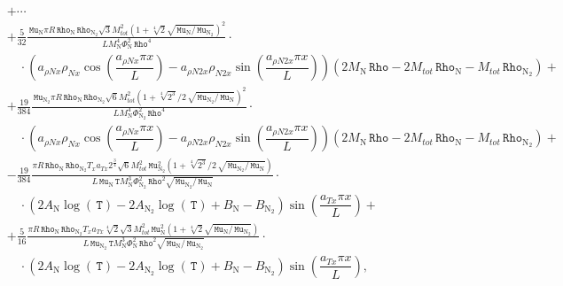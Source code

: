 \documentclass[10pt]{article}
\newcommand{\diff}[2] {\dfrac{\partial #1 }{\partial #2}}
\newcommand{\Rho}{\,\mathtt{Rho}}
\newcommand{\T}{\,\mathtt{T}}
\newcommand{\N}{\text{N}}
\newcommand{\Mu}{\, \mathtt{Mu}}
\newcommand{\mix}{\text{mix}\,}
\newcommand{\DKappatrDx}{\diff{\kappa^{tr}_{\mix}}{x}\,}
\begin{document}
\begin{equation*}
\begin{split} %
&+\cdots\\%
&+ \frac{5}{32} \frac{\Mu_{\N} \pi R \Rho_{\N} \Rho_{\N_2} \sqrt{3} M_{tot}^{2} \left(1 + \sqrt[4]{2} \sqrt{ \Mu_{\N} / \Mu_{\N_2}
}\right)^{2} }{L M_{\N}^{4} \Phi_{\N}^{2} \Rho^{4}} \cdot\\
 &\quad \cdot \left(a_{\rho N x} \rho_{N x} \cos\left(\dfrac{a_{\rho N x} \pi x}{L}\right) - a_{\rho N2 x} \rho_{N2 x}
\sin\left(\dfrac{a_{\rho N2 x} \pi x}{L}\right)\right)\left(2 M_{\N} \Rho - 2 M_{tot} \Rho_{\N} - M_{tot} \Rho_{\N_2}\right) +\\ 
%
&+ \frac{19}{384} \frac{\Mu_{\N_2} \pi R \Rho_{\N} \Rho_{\N_2} \sqrt{6} M_{tot}^{2} \left(1 + \sqrt[4]{2^3} / 2 \, \sqrt{
\Mu_{\N_2} / \Mu_{\N} }\right)^{2} }{L M_{\N}^{4} \Phi_{\N_2}^{2} \Rho^{4}} \cdot\\
 &\quad \cdot \left(a_{\rho N x} \rho_{N x} \cos\left(\dfrac{a_{\rho N x} \pi x}{L}\right) - a_{\rho N2 x} \rho_{N2 x}
\sin\left(\dfrac{a_{\rho N2 x} \pi x}{L}\right)\right)\left(2 M_{\N} \Rho - 2 M_{tot} \Rho_{\N} - M_{tot} \Rho_{\N_2}\right) +\\ 
%
&- \frac{19}{384} \frac{\pi R \Rho_{\N} \Rho_{\N_2} T_{x} a_{Tx} 2^{\frac{3}{4}} \sqrt{6} M_{tot}^{2} \Mu_{\N_2}^{2} \left(1 +
\sqrt[4]{2^3} / 2 \, \sqrt{ \Mu_{\N_2} / \Mu_{\N} }\right) }{L \Mu_{\N} \T M_{\N}^{3} \Phi_{\N_2}^{2} \Rho^{2} \sqrt{\Mu_{\N_2} /
\Mu_{\N} } } \cdot\\
 &\quad \cdot ( 2 A_{\N} \log(\T) - 2 A_{\N_2} \log(\T) +B_{\N} - B_{\N_2} ) \sin\left(\dfrac{a_{Tx} \pi x}{L}\right) +\\ 
%
&+ \frac{5}{16} \frac{\pi R \Rho_{\N} \Rho_{\N_2} T_{x} a_{Tx} \sqrt[4]{2} \sqrt{3} M_{tot}^{2} \Mu_{\N}^{2} \left(1 + \sqrt[4]{2}
\sqrt{ \Mu_{\N} / \Mu_{\N_2} }\right) }{L \Mu_{\N_2} \T M_{\N}^{3} \Phi_{\N}^{2} \Rho^{2} \sqrt{\Mu_{\N} / \Mu_{\N_2} } } \cdot\\
 &\quad \cdot ( 2 A_{\N} \log(\T) - 2 A_{\N_2} \log(\T) +B_{\N} - B_{\N_2} ) \sin\left(\dfrac{a_{Tx} \pi x}{L}\right),\\
%
%
\end{split}
\end{equation*}
\end{document}
